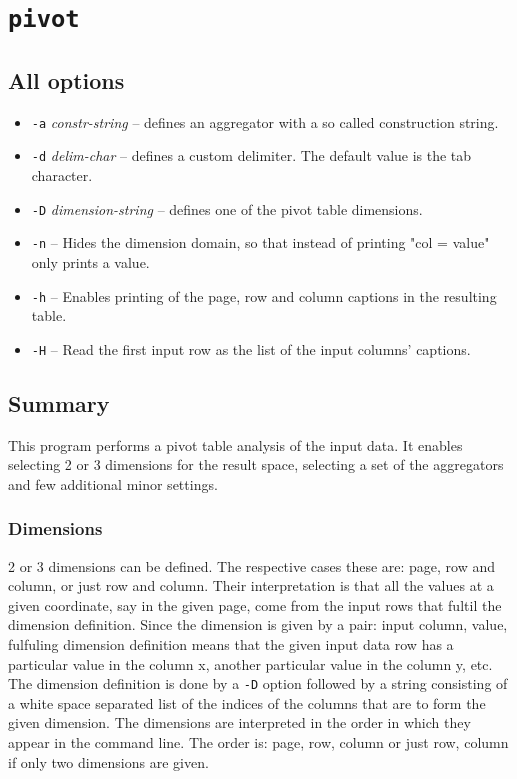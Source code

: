 
\section{\texttt{pivot}}

	\subsection{All options}
	\begin{itemize}
		\item \texttt{-a} \textit{constr-string} -- defines an aggregator with a
			so called construction string.
		\item \texttt{-d} \textit{delim-char} -- defines a custom delimiter.
			The default value is the tab character.
		\item \texttt{-D} \textit{dimension-string} -- defines one of the pivot
			table dimensions.
		\item \texttt{-n} -- Hides the dimension domain, so that instead of printing
			"col = value" only prints a value.
		\item \texttt{-h} -- Enables printing of the page, row and column
			captions in the resulting table.
		\item \texttt{-H} -- Read the first input row as the list of the input
			columns' captions.
	\end{itemize}

	\subsection{Summary}
	This program performs a pivot table analysis of the input data. It enables
	selecting 2 or 3 dimensions for the result space, selecting a set of the
	aggregators and few additional minor settings.

	\subsubsection{Dimensions}
	2 or 3 dimensions can be defined. The respective cases these are: page, row
	and column, or just row and column. Their interpretation is that all the values
	at a given coordinate, say in the given page, come from the input rows that fultil
	the dimension definition. Since the dimension is given by a pair: input column,
	value, fulfuling dimension definition means that the given input data row has
	a particular value in the column x, another particular value in the column y, etc.
	The dimension definition is done by a \texttt{-D} option followed by a string
	consisting of a white space separated list of the indices of the columns that are
	to form the given dimension. The dimensions are interpreted in the order in which
	they appear in the command line. The order is: page, row, column or just row, column
	if only two dimensions are given.

